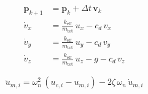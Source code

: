 \begin{align}
\label{eq:nmpc_predict}
\mathbf{p}_{k+1} &= \mathbf{p}_k + \Delta t\,\mathbf{v}_k \\
\dot{v}_{x} &= \frac{k_{\mathrm{eff}}}{m_{\mathrm{tot}}}\,u_x
              - c_d\,v_x \\
\dot{v}_{y} &= \frac{k_{\mathrm{eff}}}{m_{\mathrm{tot}}}\,u_y
              - c_d\,v_y \\
\dot{v}_{z} &= \frac{k_{\mathrm{eff}}}{m_{\mathrm{tot}}}\,u_z
              - g - c_d\,v_z
\end{align}

\begin{equation}
\label{eq:motor}
\ddot{u}_{m,i} = \omega_n^2\,(u_{c,i} - u_{m,i})
               - 2\zeta\,\omega_n\,\dot{u}_{m,i}
\end{equation}




